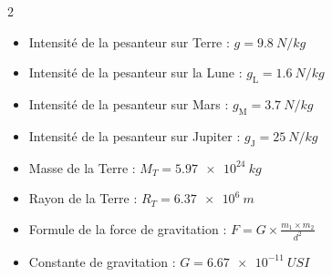 \documentclass[11pt,a5paper,landscape]{article}
\begin{document}
\begin{tcolorbox}[
  title=\textbf{Données},
  colback=headergrey!30,
  colframe=black,
  fonttitle=\normalsize,
  boxrule=0.8pt,
  left=6pt, right=6pt, top=4pt, bottom=4pt
]
\begin{multicols}{2}
\begin{itemize}
  \item Intensité de la pesanteur sur Terre : $g = \SI{9,8}{N/kg}$
  \item Intensité de la pesanteur sur la Lune : $g_{\text{L}} = \SI{1,6}{N/kg}$
  \item Intensité de la pesanteur sur Mars : $g_{\text{M}} = \SI{3,7}{N/kg}$
  \item Intensité de la pesanteur sur Jupiter : $g_{\text{J}} = \SI{25}{N/kg}$
\end{itemize}
\columnbreak
\begin{itemize}
  \item Masse de la Terre : $M_T = \SI{5,97e24}{kg}$
  \item Rayon de la Terre : $R_T = \SI{6,37e6}{m}$
  \item Formule de la force de gravitation : $F = G \times \frac{m_1 \times m_2}{d^2}$
  \item Constante de gravitation : $G = \SI{6,67e-11}{} USI$
\end{itemize}
\end{multicols}
\end{tcolorbox}

\vspace{0.4em}
\end{document}
